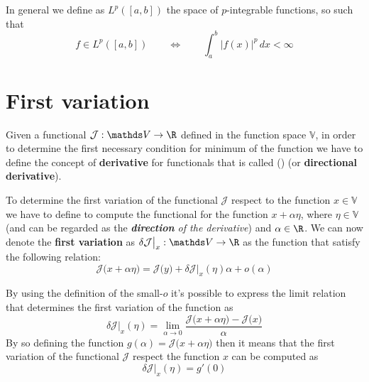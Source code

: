 In general we define as $L^p([a,b])$ the space of $p$-integrable functions, so such that
\[ f\in L^p([a,b])  \qquad \Leftrightarrow \qquad \int_a^b |f(x)|^p\, dx < \infty\]


\section{First variation}

Given a functional $\mathcal J: \mathds V\rightarrow \R$ defined in the function space $\mathds V$, in order to determine the first necessary condition for minimum of the function we have to define the concept of \textbf{derivative} for functionals that is called ()  (or \textbf{directional derivative}).

To determine the first variation of the functional $\mathcal J$ respect to the function $x\in \mathds V$ we have to define to compute the functional for the function $x + \alpha \eta$, where $\eta \in \mathds V$ (and can be regarded as the \textit{\textbf{direction} of the derivative}) and $\alpha \in \R$. We can now denote the \textbf{first variation} as $\delta \mathcal J\big|_x:\mathds V\rightarrow \R$ as the function that satisfy the following relation:
\begin{equation}
	\mathcal J\big(x + \alpha \eta\big) = \mathcal J\big(y\big) + \delta \mathcal J\big|_x(\eta)\alpha +  o(\alpha)
\end{equation}

By using the definition of the small-$o$ it's possible to express the limit relation that determines the first variation of the function as
\begin{equation}
	\delta \mathcal J\big|_x (\eta) = \lim_{\alpha\rightarrow 0} \frac{\mathcal J\big(x + \alpha \eta\big) - \mathcal J\big(x\big)}{\alpha}
\end{equation}
By so defining the function $g(\alpha) = \mathcal J\big(x+ \alpha \eta \big)$	then it means that the first variation of the functional $\mathcal J$ respect the function $x$ can be computed as
\begin{equation} \label{eq:func:dirderivative}
	\delta \mathcal J\big|_x(\eta) = g'(0)
\end{equation}


